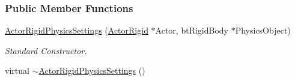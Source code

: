 \subsubsection*{Public Member Functions}
\begin{DoxyCompactItemize}
\item 
\hyperlink{classphys_1_1ActorRigidPhysicsSettings_a002e4932e1d8192a7aa45c1e4c159774}{ActorRigidPhysicsSettings} (\hyperlink{classphys_1_1ActorRigid}{ActorRigid} $\ast$Actor, btRigidBody $\ast$PhysicsObject)
\begin{DoxyCompactList}\small\item\em Standard Constructor. \item\end{DoxyCompactList}\item 
\hypertarget{classphys_1_1ActorRigidPhysicsSettings_a8c8d4581ff653208bbe5ddaad84feb4d}{
virtual \hyperlink{classphys_1_1ActorRigidPhysicsSettings_a8c8d4581ff653208bbe5ddaad84feb4d}{$\sim$ActorRigidPhysicsSettings} ()}
\label{d1/d17/classphys_1_1ActorRigidPhysicsSettings_a8c8d4581ff653208bbe5ddaad84feb4d}


\end{DoxyCompactItemize}

